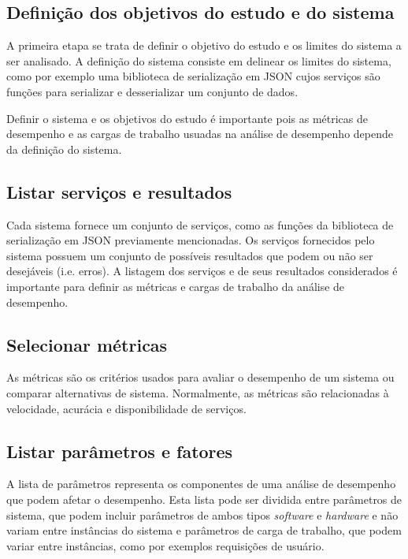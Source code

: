 \subsection{Definição dos objetivos do estudo e do sistema}

A primeira etapa se trata de definir o objetivo do estudo e os limites do sistema a ser analisado. A definição do sistema consiste em delinear os limites do sistema, como por exemplo uma biblioteca de serialização em JSON cujos serviços são funções para serializar e desserializar um conjunto de dados.

Definir o sistema e os objetivos do estudo é importante pois as métricas de desempenho e as cargas de trabalho usuadas na análise de desempenho depende da definição do sistema.

\subsection{Listar serviços e resultados}

Cada sistema fornece um conjunto de serviços, como as funções da biblioteca de serialização em JSON previamente mencionadas. Os serviços fornecidos pelo sistema possuem um conjunto de possíveis resultados que podem ou não ser desejáveis (i.e. erros). A listagem dos serviços e de seus resultados considerados é importante para definir as métricas e cargas de trabalho da análise de desempenho.

\subsection{Selecionar métricas}

As métricas são os critérios usados para avaliar o desempenho de um sistema ou comparar alternativas de sistema. Normalmente, as métricas são relacionadas à velocidade, acurácia e disponibilidade de serviços.

\subsection{Listar parâmetros e fatores}

A lista de parâmetros representa os componentes de uma análise de desempenho que podem afetar o desempenho. Esta lista pode ser dividida entre parâmetros de sistema, que podem incluir parâmetros de ambos tipos \textit{software} e \textit{hardware} e não variam entre instâncias do sistema e parâmetros de carga de trabalho, que podem variar entre instâncias, como por exemplos requisições de usuário.

